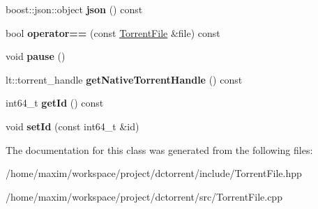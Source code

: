 \begin{DoxyCompactItemize}
boost\+::json\+::object {\bfseries json} () const
\item 
\mbox{\label{class_torrent_file_a1c08dc50fd62ab94752ef59e848a2963}} 
bool {\bfseries operator==} (const \hyperlink{class_torrent_file}{Torrent\+File} \&file) const
\item 
\mbox{\label{class_torrent_file_a3a45110028c23fd44b9852dd6f2407bf}} 
void {\bfseries pause} ()
\item 
\mbox{\label{class_torrent_file_a7e1f048d2dfa195638155d62fe5ab02c}} 
lt\+::torrent\+\_\+handle {\bfseries get\+Native\+Torrent\+Handle} () const
\item 
\mbox{\label{class_torrent_file_ade6c6fe4d6214f2ce004b40532746dba}} 
int64\+\_\+t {\bfseries get\+Id} () const
\item 
\mbox{\label{class_torrent_file_a757e86a747ebcb13bd57cf4de1c9d013}} 
void {\bfseries set\+Id} (const int64\+\_\+t \&id)
\end{DoxyCompactItemize}


The documentation for this class was generated from the following files\+:\begin{DoxyCompactItemize}
\item 
/home/maxim/workspace/project/dctorrent/include/Torrent\+File.\+hpp\item 
/home/maxim/workspace/project/dctorrent/src/Torrent\+File.\+cpp\end{DoxyCompactItemize}
